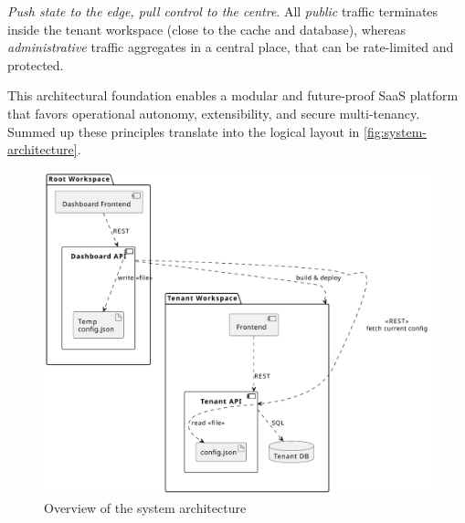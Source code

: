 \documentclass[11pt, a4paper, oneside, listof=totoc]{scrartcl}
\begin{document}
\begin{enumerate}[label={[\arabic*]:},
                    ref=Challenge~\arabic*,
                    leftmargin=*,
                    itemsep=0.6\baselineskip]
                    \item\label{chal:pushState}
                        \textit{Push state to the edge, pull control to the centre}.
                        All \textit{public} traffic terminates inside the tenant workspace
                        (close to the cache and database), whereas \textit{administrative} traffic
                        aggregates in a central place, that can be rate-limited and protected.

                \end{enumerate}

                This architectural foundation enables a modular and future-proof SaaS platform that
                favors operational autonomy, extensibility, and secure multi-tenancy.
                \\
                Summed up these principles translate into the logical layout in
                \autoref{fig:system-architecture}.
                \vspace{0.5cm}
                \begin{figure}[H]
                    \centering
                    \includegraphics[scale=0.75]{images/WorkspaceArchitecture.pdf}
                    \caption{Overview of the system architecture}\label{fig:system-architecture}
                \end{figure}
\end{document}
